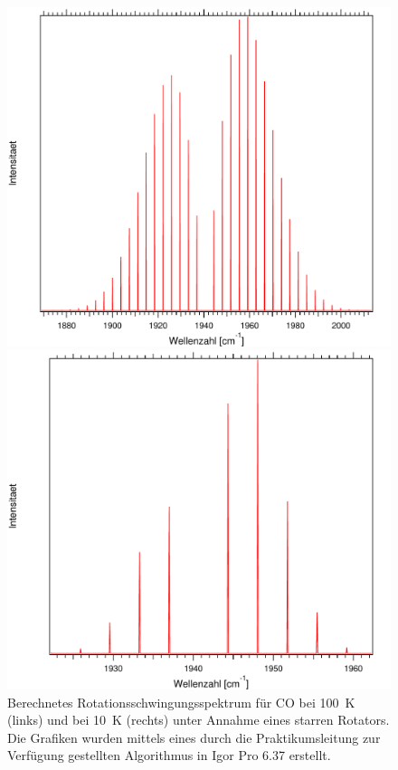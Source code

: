 \begin{figure}[H]
	
	\begin{minipage}{0.5\textwidth}
	\includegraphics[width=\textwidth]{Bilder/100CO.pdf}
	
	\end{minipage}
\begin{minipage}{0.5\textwidth}
	\includegraphics[width=\textwidth]{Bilder/10CO.pdf}
	
	\end{minipage}	
	\caption{Berechnetes Rotationsschwingungsspektrum für CO bei 100~K (links) und bei 10~K (rechts) unter Annahme eines starren Rotators. Die Grafiken wurden mittels eines durch die Praktikumsleitung zur Verfügung gestellten Algorithmus in Igor Pro 6.37 erstellt.}
	\label{Rot:100CO}
		
	
\end{figure}

